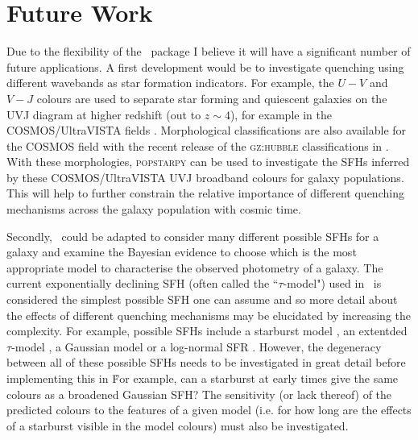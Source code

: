 \section{Future Work}\label{sec:future}

Due to the flexibility of the \starpy\ package I believe it will have a significant number of future applications. A first development would be to investigate quenching using different wavebands as star formation indicators. For example, the $U-V$ and $V-J$ colours are used to separate star forming and quiescent galaxies on the UVJ diagram \citep{labbe05, wuyts07, williams09, brammer11, patel12} at higher redshift (out to $z\sim4$), for example in the COSMOS/UltraVISTA fields \citep[e.g. see work by][]{muzzin13}. Morphological classifications are also available for the COSMOS field with the recent release of the \textsc{gz:hubble} classifications in \cite{willett16}. With these morphologies, \textsc{popstarpy} can be used to investigate the SFHs inferred by these COSMOS/UltraVISTA UVJ broadband colours for galaxy populations. This will help to further constrain the relative importance of different quenching mechanisms across the galaxy population with cosmic time. 

Secondly, \starpy\ could be adapted to consider many different possible SFHs for a galaxy and examine the Bayesian evidence to choose which is the most appropriate model to characterise the observed photometry of a galaxy. The current exponentially declining SFH (often called the ``$\tau$-model") used in \starpy\ is considered the simplest possible SFH one can assume and so more detail about the effects of different quenching mechanisms may be elucidated by increasing the complexity. For example, possible SFHs include a starburst model \citep{kauffmann03}, an extentded $\tau$-model \citep{simha14}, a Gaussian model \citep{feuillet16} or a log-normal SFR \citep{gladders13, abramson16}. However, the degeneracy between all of these possible SFHs needs to be investigated in great detail before implementing this in \starpy\. For example, can a starburst at early times give the same colours as a broadened Gaussian SFH? The sensitivity (or lack thereof) of the predicted colours to the features of a given model (i.e. for how long are the effects of a starburst visible in the model colours) must also be investigated. 

